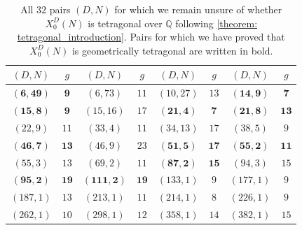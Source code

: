\documentclass[11pt,reqno]{amsart}
\newcommand{\Q}{\mathbb{Q}}
\theoremstyle{definition}
\begin{document}
{
\begin{longtable}{|c|c||c|c||c|c||c|c|}
\caption{All $32$ pairs $(D,N)$ for which we remain unsure of whether $X_0^D(N)$ is tetragonal over $\Q$ following \cref{theorem: tetragonal_introduction}. Pairs for which we have proved that $X_0^D(N)$ is geometrically tetragonal are written in bold.}\label{table: remaining_tetragonal_candidates} \\ \hline 
$(D,N)$ & $g$ & $(D,N)$ & $g$ & $(D,N)$ & $g$ & $(D,N)$ & $g$ \\ \hline 
$ \mathbf{(
6 , 49 )}$ & $\mathbf{ 9 }$
 & 
$ (
6 , 73 )$ & $ 11 $
 & 
$ (
10 , 27 )$ & $ 13 $

 &
 $\mathbf{ (
14 , 9 )}$ & $\mathbf{ 7 }$
\\ \hline 
$ \mathbf{(
15 , 8 )}$ & $\mathbf{ 9 }$
 & 
$ (
15 , 16 )$ & $ 17 $
 &
$ \mathbf{(
21 , 4 )}$ & $\mathbf{ 7 }$
 & 
$ \mathbf{(
21 , 8 )}$ & $\mathbf{ 13 }$
\\ \hline 
$ (
22 , 9 )$ & $ 11 $
&
$ (
33 , 4 )$ & $ 11 $
 & 
$ (
34 , 13 )$ & $ 17 $
 & 
$ (
38 , 5 )$ & $ 9 $
\\ \hline
$ \mathbf{(
46 , 7 )}$ & $\mathbf{ 13 }$
 & 
$ (
46 , 9 )$ & $ 23 $
 & 
$\mathbf{ (
51 , 5 )}$ & $\mathbf{ 17 }$
 &
$ \mathbf{(
55 , 2 )}$ & $\mathbf{ 11 }$
 \\ \hline
$ (
55 , 3 )$ & $ 13 $
 & 
$ (
69 , 2 )$ & $ 11 $
 &
$\mathbf{ (
87 , 2 )}$ & $\mathbf{ 15 }$
 & 
$ (
94 , 3 )$ & $ 15 $
\\ \hline 
$\mathbf{ (
95 , 2 )}$ & $\mathbf{ 19 }$
&
$\mathbf{ (
111 , 2 )}$ & $\mathbf{ 19 }$
 & 
$ (
133 , 1 )$ & $ 9 $
 & 
$ (
177 , 1 )$ & $ 9 $
\\ \hline
$ (
187 , 1 )$ & $ 13 $
 & 
$ (
213 , 1 )$ & $ 11 $
 & 
$ (
214 , 1 )$ & $ 8 $
 &
$ (
226 , 1 )$ & $ 9 $
\\ \hline 
$ (
262 , 1 )$ & $ 10 $
 & 
$ (
298 , 1 )$ & $ 12 $
&
$ (
358 , 1 )$ & $ 14 $ & 
$ (
382 , 1 )$ & $ 15 $ \\ \hline
\end{longtable}
}
\end{document}
